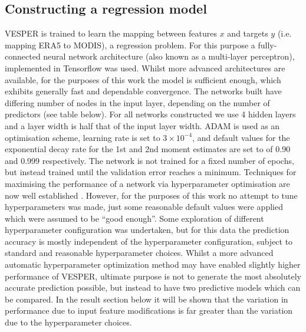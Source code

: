\documentclass[hess, twostagejnl]{copernicus}
\begin{document}
\subsection{Constructing a regression model}
VESPER is trained to learn the mapping between features $x$ and targets $y$ (i.e. mapping ERA5 to MODIS), a regression problem. For this purpose a fully-connected neural network architecture (also known as a multi-layer perceptron), implemented in Tensorflow \citep{2016arXiv160304467A} was used. Whilst more advanced architectures are available, for the purposes of this work the model is sufficient enough, which exhibits generally fast and dependable convergence. The networks built have differing number of nodes in the input layer, depending on the number of predictors (see table below). For all networks constructed we use 4 hidden layers and a layer width is half that of the input layer width. ADAM \citep{2014adam} is used as an optimisation scheme, learning rate is set to $3 \times 10^{-4}$, and default values for the exponential decay rate for the 1st and 2nd moment estimates are set to of 0.90 and 0.999 respectively. The network is not trained for a fixed number of epochs, but instead trained until the validation error reaches a minimum. Techniques for maximising the performance of a network via hyperparameter optimisation are now well established \citep{HPO1,HPO2}. However, for the purposes of this work no attempt to tune hyperparameters was made, just some reasonable default values were applied which were assumed to be “good enough”. Some exploration of different hyperparameter configuration was undertaken, but for this data the prediction accuracy is mostly independent of the hyperparameter configuration, subject to standard and reasonable hyperparameter choices. Whilst a more advanced automatic hyperparameter optimization method may have enabled slightly higher performance of VESPER, ultimate purpose is not to generate the most absolutely accurate prediction possible, but instead to have two predictive models which can be compared. In the result section below it will be shown that the variation in performance due to input feature modifications is far greater than the variation due to the hyperparameter choices. \newline 
\end{document}
